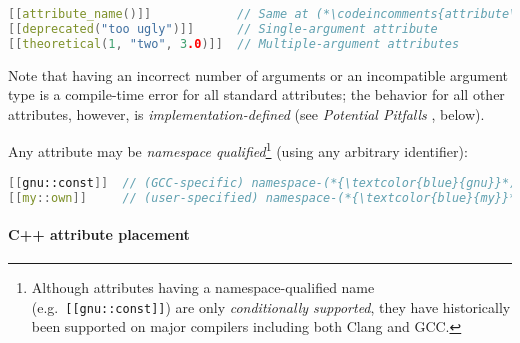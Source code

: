 \documentclass[twoside,10pt,letterpaper,usenames]{newstyle-PearsonGeneric-7-38}
\newcommand{\codeincomments}{\color{skyblue}\ttfamily}
\begin{document}
\begin{lstlisting}[language=C++]
[[attribute_name()]]            // Same at (*\codeincomments{attribute\_name}*)
[[deprecated("too ugly")]]      // Single-argument attribute
[[theoretical(1, "two", 3.0)]]  // Multiple-argument attributes
\end{lstlisting}
    

Note that having an incorrect number of arguments or an incompatible
argument type is a compile-time error for all standard attributes; the
behavior for all other attributes, however, is
\emph{implementation-defined} (see \emph{Potential Pitfalls} , below).

Any attribute may be \emph{namespace qualified}{\cprotect\footnote{Although
  attributes having a namespace-qualified name
  (e.g.~\texttt{[[gnu::const]]}) are only {\emph{conditionally
  supported}}, they have historically been supported on major compilers
  including both Clang and GCC.}} (using any arbitrary identifier):

\begin{lstlisting}[language=C++]
[[gnu::const]]  // (GCC-specific) namespace-(*{\textcolor{blue}{gnu}}*)-qualified (*{\textcolor{blue}{const}}*) attribute
[[my::own]]     // (user-specified) namespace-(*{\textcolor{blue}{my}}*)-qualified (*{\textcolor{blue}{own}}*) attribute
\end{lstlisting}
    

\paragraph[C++ attribute placement]{C++ attribute placement}\label{c++-attribute-placement}
\end{document}
